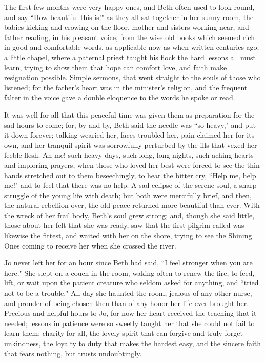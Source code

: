 The first few months were very happy ones, and Beth often used to look
round, and say ``How beautiful this is!" as they all sat together in her
sunny room, the babies kicking and crowing on the floor, mother and
sisters working near, and father reading, in his pleasant voice, from
the wise old books which seemed rich in good and comfortable words, as
applicable now as when written centuries ago; a little chapel, where a
paternal priest taught his flock the hard lessons all must learn, trying
to show them that hope can comfort love, and faith make resignation
possible. Simple sermons, that went straight to the souls of those who
listened; for the father's heart was in the
minister's religion, and the frequent falter in the
voice gave a double eloquence to the words he spoke or read.

It was well for all that this peaceful time was given them as
preparation for the sad hours to come; for, by and by, Beth said the
needle was ``so heavy," and put it down forever; talking wearied her,
faces troubled her, pain claimed her for its own, and her tranquil
spirit was sorrowfully perturbed by the ills that vexed her feeble
flesh. Ah me! such heavy days, such long, long nights, such aching
hearts and imploring prayers, when those who loved her best were forced
to see the thin hands stretched out to them beseechingly, to hear the
bitter cry, ``Help me, help me!" and to feel that there was no help. A
sad eclipse of the serene soul, a sharp struggle of the young life with
death; but both were mercifully brief, and then, the natural rebellion
over, the old peace returned more beautiful than ever. With the wreck of
her frail body, Beth's soul grew strong; and, though she
said little, those about her felt that she was ready, saw that the first
pilgrim called was likewise the fittest, and waited with her on the
shore, trying to see the Shining Ones coming to receive her when she
crossed the river.

Jo never left her for an hour since Beth had said, ``I feel stronger when
you are here." She slept on a couch in the room, waking often to renew
the fire, to feed, lift, or wait upon the patient creature who seldom
asked for anything, and ``tried not to be a trouble." All day she haunted
the room, jealous of any other nurse, and prouder of being chosen then
than of any honor her life ever brought her. Precious and helpful hours
to Jo, for now her heart received the teaching that it needed; lessons
in patience were so sweetly taught her that she could not fail to learn
them; charity for all, the lovely spirit that can forgive and truly
forget unkindness, the loyalty to duty that makes the hardest easy, and
the sincere faith that fears nothing, but trusts undoubtingly.

